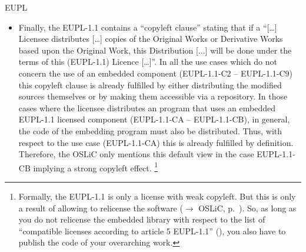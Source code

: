 \begin{license}{EUPL}
\begin{itemize}
\item Finally, the EUPL-1.1 contains a \enquote{copyleft clause} stating that if a
  \enquote{[\ldots] Licensee distributes [\ldots] copies of the Original Works
  or Derivative Works based upon the Original Work, this Distribution [...] will
  be done under the terms of this (EUPL-1.1) Licence [\ldots]}. In all the use cases
  which do not concern the use of an embedded component (EUPL-1.1-C2 -- EUPL-1.1-C9) this
  copyleft clause is already fulfilled by either distributing the modified
  sources themselves or by making them accessible via a repository. In those
  cases where the licensee distributes an program that uses an embedded EUPL-1.1
  licensed component (EUPL-1.1-CA -- EUPL-1.1-CB), in general, the code of the embedding
  program must also be distributed. Thus, with respect to the use case (EUPL-1.1-CA)
  this is already fulfilled by definition. Therefore, the OSLiC only mentions
  this default view in the case EUPL-1.1-CB implying a strong copyleft effect.%
  \footnote{Formally, the EUPL-1.1 is only a license with weak copyleft. 
    But this is only a result of allowing to relicense the software
    ($\rightarrow$ OSLiC, p.\ ). So, as long as
    you do not relicense the embedded library with respect to the list of
    \enquote{compatible licenses according to article 5 EUPL-1.1} 
    (\cite[cf.][\nopage wp §5 and Appendix]{EuplLicense2007en}), 
    you also have to publish the code of your overarching work.}

\end{itemize}

\end{license}

%

